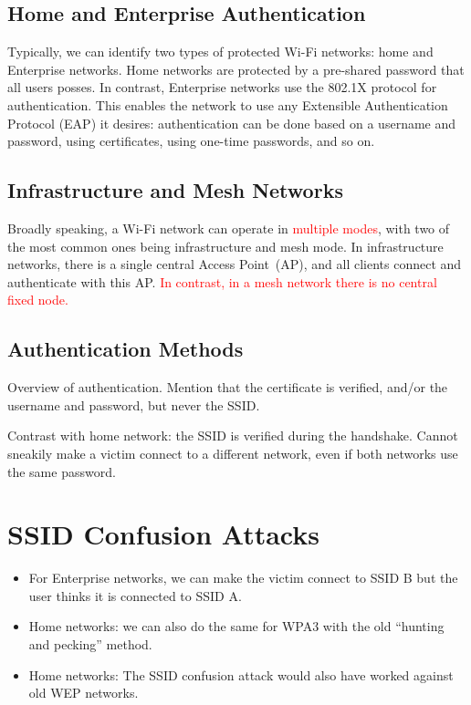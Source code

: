 \documentclass[sigconf,review]{acmart}
\newcommand{\wifi}{\mbox{Wi-Fi}}
\DeclareRobustCommand{\red}[1]{\textcolor{red}{#1}}
\begin{document}
\subsection{Home and Enterprise Authentication}

Typically, we can identify two types of protected \wifi{} networks: home and Enterprise networks.
Home networks are protected by a pre-shared password that all users posses.
In contrast, Enterprise networks use the 802.1X protocol for authentication.
This enables the network to use any Extensible Authentication Protocol (EAP) it desires: authentication can be done based on a username and password, using certificates, using one-time passwords, and so on.

\subsection{Infrastructure and Mesh Networks}

Broadly speaking, a \wifi{} network can operate in \red{multiple modes}, with two of the most common ones being infrastructure and mesh mode.
In infrastructure networks, there is a single central Access Point~(AP), and all clients connect and authenticate with this AP.
\red{In contrast, in a mesh network there is no central fixed node.}

\subsection{Authentication Methods}

Overview of authentication. Mention that the certificate is verified, and/or the username and password, but never the SSID.

Contrast with home network: the SSID is verified during the handshake.
Cannot sneakily make a victim connect to a different network, even if both networks use the same password.

\section{SSID Confusion Attacks}
\label{sec:improvedinjection}



\begin{itemize}
	\item For Enterprise networks, we can make the victim connect to SSID B but the user thinks it is connected to SSID A.

	\item Home networks: we can also do the same for WPA3 with the old ``hunting and pecking'' method.
	
	\item Home networks: The SSID confusion attack would also have worked against old WEP networks.
\end{itemize}
\end{document}
